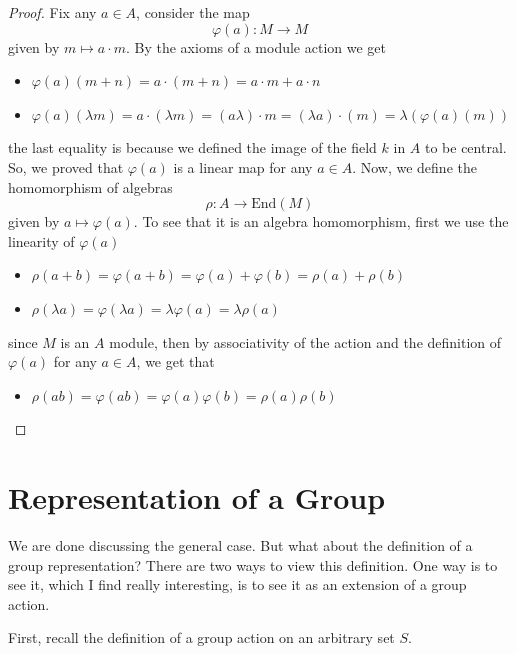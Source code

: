 \begin{proof}
    Fix any $a \in A$, consider the map
    \[
    \varphi(a): M \to M
    \]
    given by $m \mapsto a \cdot m$. By the axioms of a module action we get 
    \begin{itemize}
        \item $\varphi(a) (m+n) = a \cdot (m + n) = a \cdot m + a \cdot n $
        \item $\varphi(a) (\lambda m) = a \cdot (\lambda m) = (a \lambda) \cdot m = (\lambda a) \cdot (m) = \lambda(\varphi(a) (m)) 
         $
    \end{itemize}
    the last equality is because we defined the image of the field $k$ in $A$ to be central. So, we proved that $\varphi(a)$ is a linear map for any $a \in A$. Now, we define the homomorphism of algebras
    \[
    \rho: A \to \text{End}(M)
    \]
    given by $a \mapsto \varphi(a)$. To see that it is an algebra homomorphism, first we use the linearity of $\varphi(a)$
    \begin{itemize}
    \item $\rho(a + b ) = \varphi(a+b) = \varphi(a) + \varphi(b) = \rho(a) + \rho(b)$
    \item $\rho( \lambda a) = \varphi(\lambda a) = \lambda \varphi(a) = \lambda \rho(a)$
    
    \end{itemize}
    since $M$ is an $A$ module, then by associativity of the action and the definition of $\varphi(a)$ for any $a \in A$, we get that 
\begin{itemize}
    \item $\rho(ab) = \varphi(ab) = \varphi(a) \varphi(b) = \rho(a)\rho(b)$
\end{itemize}

\end{proof}


\section{Representation of a Group}
We are done discussing the general case. But what about the definition of a group representation? 
There are two ways to view this definition. One way is to see it, which I find really interesting, is to see it as an extension of a group action.

First, recall the definition of a group action on an arbitrary set $S$.


